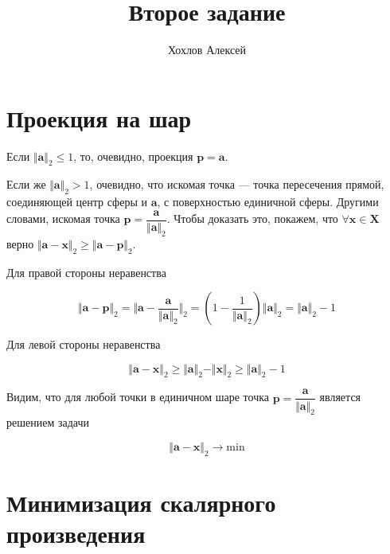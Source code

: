 
\title{Второе задание}
\author{
	Хохлов Алексей \\
}


	\maketitle
	

	\section{Проекция на шар}
	
	Если $\Vert \mathbf{a} \Vert_2 \leqslant 1$, то, очевидно, проекция $\mathbf{p} = \mathbf{a}$.
	
	Если же $\Vert \mathbf{a} \Vert_2 > 1$, очевидно, что искомая точка --- точка пересечения прямой, соединяющей центр сферы и $\mathbf{a}$, с поверхностью единичной сферы. Другими словами, искомая точка $\mathbf{p} = \dfrac{\mathbf{a}}{\Vert \mathbf{a} \Vert_2 }$. Чтобы доказать это, покажем, что $\forall \mathbf{x} \in \mathbf{X}  $ верно $\Vert \mathbf{a} - \mathbf{x} \Vert_2 \geqslant  \Vert \mathbf{a} - \mathbf{p} \Vert_2$.
	
	Для правой стороны неравенства
	
	\begin{equation}
	\Vert \mathbf{a} - \mathbf{p} \Vert_2 = \Vert \mathbf{a} - \frac{\mathbf{a}}{\Vert \mathbf{a} \Vert_2} \Vert_2 =  ( 1 - \frac{1}{\Vert \mathbf{a} \Vert_2}) \Vert \mathbf{a} \Vert_2  = \Vert \mathbf{a} \Vert_2 - 1
	\end{equation}
	
	Для левой стороны неравенства
	
	\begin{equation}
	\Vert \mathbf{a} - \mathbf{x} \Vert_2 \geqslant \Vert \mathbf{a} \Vert_2 - \Vert \mathbf{x} \Vert_2 \geqslant \Vert \mathbf{a} \Vert_2 - 1
	\end{equation}
	
	Видим, что для любой точки в единичном шаре точка $\mathbf{p} = \dfrac{\mathbf{a}}{\Vert \mathbf{a} \Vert_2 }$ является решением задачи
	
	\begin{equation}
	\Vert \mathbf{a} - \mathbf{x} \Vert_2 \rightarrow \text{min}
	\end{equation}
	
	\section{Минимизация скалярного произведения}
	
